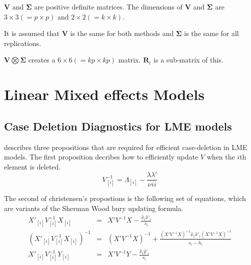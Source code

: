 \documentclass[12pt, a4paper]{report}
\theoremstyle{plain}
\theoremstyle{definition}
\theoremstyle{remark}
\begin{document}
$\boldsymbol{V}$ and $\boldsymbol{\Sigma}$ are positive
definite matrices. The dimensions of $\boldsymbol{V}$ and
$\boldsymbol{\Sigma}$ are $3 \times 3 ( = p \times p )$ and $ 2 \times
2 (= k \times k)$.\\
\bigskip


It is assumed that $\boldsymbol{V}$ is the same for both methods and $\boldsymbol{\Sigma}$ is
the same for all replications.\\
\bigskip

$\boldsymbol{V} \bigotimes \boldsymbol{\Sigma}$ creates a $ 6 \times 6 ( = kp \times
kp)$ matrix.
$\boldsymbol{R}_{i}$ is a sub-matrix of this.\\
\bigskip



	\chapter{Linear Mixed effects Models}
		
		\section{Case Deletion Diagnostics for LME models}
		
		
		
		\citet{Christensen} describes three propositions that are required
		for efficient case-deletion in LME models. The first proposition
		decribes how to efficiently update $V$ when the $i$th element is
		deleted.
		\begin{equation}
		V_{[i]}^{-1} = \Lambda_{[i]} - \frac{\lambda
			\lambda\prime}{\nu^{}ii}
		\end{equation}
		
		The second of christensen's propostions is the following set of
		equations, which are variants of the Sherman Wood bury updating
		formula.
		\begin{eqnarray}
		X'_{[i]}V_{[i]}^{-1}X_{[i]} &=& X' V^{-1}X -
		\frac{\hat{x}_{i}\hat{x}'_{i}}{s_{i}}\\
		(X'_{[i]}V_{[i]}^{-1}X_{[i]})^{-1} &=& (X' V^{-1}X)^{-1} +
		\frac{(X' V^{-1}X)^{-1}\hat{x}_{i}\hat{x}' _{i}
			(X' V^{-1}X)^{-1}}{s_{i}- \bar{h}_{i}}\\
		X'_{[i]}V_{[i]}^{-1}Y_{[i]} &=& X\prime V^{-1}Y -
		\frac{\hat{x}_{i}\hat{y}' _{i}}{s_{i}}
		\end{eqnarray}
		
\end{document}
